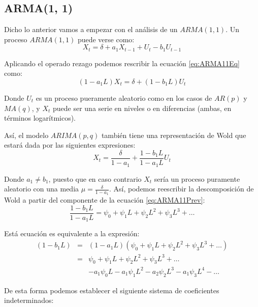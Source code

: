 \documentclass[
]{book}
\begin{document}
\hypertarget{arma1-1}{%
\subsection{ARMA(1, 1)}\label{arma1-1}}

Dicho lo anterior vamos a empezar con el análisis de un \(ARMA(1, 1)\). Un proceso \(ARMA(1, 1)\) puede verse como:
\begin{equation}
    X_t = \delta + a_1 X_{t - 1} + U_t - b_1 U_{t - 1}
    \label{eq:ARMA11Eq}
\end{equation}

Aplicando el operado rezago podemos rescribir la ecuación \eqref{eq:ARMA11Eq} como:
\begin{equation}
    (1 - a_1 L) X_t = \delta + (1 - b_1 L) U_t
\end{equation}

Donde \(U_t\) es un proceso pueramente aleatorio como en los casos de \(AR(p)\) y \(MA(q)\), y \(X_t\) puede ser una serie en niveles o en diferencias (ambas, en términos logarítmicos).

Así, el modelo \(ARIMA (p, q)\) también tiene una representación de Wold que estará dada por las siguientes expresiones:
\begin{equation}
    X_t = \frac{\delta}{1 - a_1} + \frac{1 - b_1 L}{1 - a_1 L} U_t
    \label{eq:ARMA11Prev}
\end{equation}

Donde \(a_1 \neq b_1\), puesto que en caso contrario \(X_t\) sería un proceso puramente aleatorio con una media \(\mu = \frac{\delta}{1 - a_1}\). Así, podemos reescribir la descomposición de Wold a partir del componente de la ecuación \eqref{eq:ARMA11Prev}:
\begin{equation}
    \frac{1 - b_1 L}{1 - a_1 L} = \psi_0 + \psi_1 L + \psi_2 L^2 + \psi_3 L^3 + \ldots 
    \label{eq:ARMA11EqWold}
\end{equation}

Está ecuación es equivalente a la expresión:
\begin{eqnarray}
    (1 - b_1 L) & = & (1 - a_1 L)(\psi_0 + \psi_1 L + \psi_2 L^2 + \psi_3 L^3 + \ldots) \nonumber \\
    & = & \psi_0 + \psi_1 L + \psi_2 L^2 + \psi_3 L^3 + \ldots \nonumber \\
    &   & - a_1 \psi_0 L - a_1 \psi_1 L^2 - a_2 \psi_2 L^3 - a_1 \psi_3 L^4 - \ldots \nonumber
\end{eqnarray}

De esta forma podemos establecer el siguiente sistema de coeficientes indeterminados:
\end{document}

